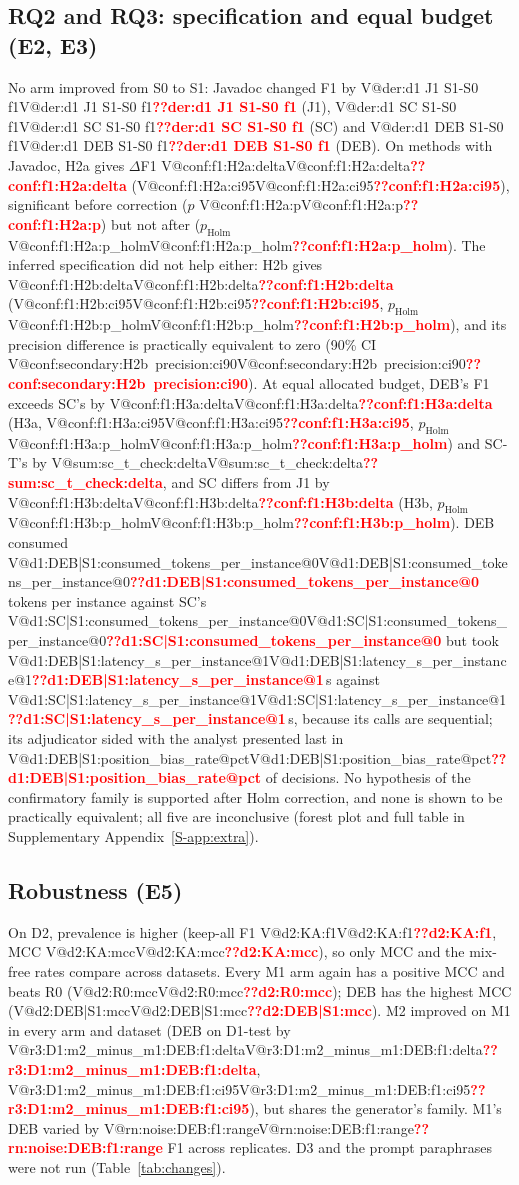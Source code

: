 \documentclass[journal]{IEEEtran}
\makeatletter
\newcommand{\V}[1]{\ifcsname V@#1\endcsname\csname V@#1\endcsname\else\textbf{\textcolor{red}{??#1}}\fi}
\newcommand{\Sref}[1]{\ref{S-#1}}
\makeatother
\begin{document}
\subsection{RQ2 and RQ3: specification and equal budget (E2, E3)}
No arm improved from S0 to S1: Javadoc changed F1 by \V{der:d1 J1 S1-S0 f1} (J1), \V{der:d1 SC S1-S0 f1} (SC) and \V{der:d1 DEB S1-S0 f1} (DEB). On methods with Javadoc, H2a gives $\Delta$F1 \V{conf:f1:H2a:delta} (\V{conf:f1:H2a:ci95}), significant before correction ($p$ \V{conf:f1:H2a:p}) but not after ($p_\mathrm{Holm}$ \V{conf:f1:H2a:p_holm}). The inferred specification did not help either: H2b gives \V{conf:f1:H2b:delta} (\V{conf:f1:H2b:ci95}, $p_\mathrm{Holm}$ \V{conf:f1:H2b:p_holm}), and its precision difference is practically equivalent to zero (90\% CI \V{conf:secondary:H2b~precision:ci90}). At equal allocated budget, DEB's F1 exceeds SC's by \V{conf:f1:H3a:delta} (H3a, \V{conf:f1:H3a:ci95}, $p_\mathrm{Holm}$ \V{conf:f1:H3a:p_holm}) and SC-T's by \V{sum:sc_t_check:delta}, and SC differs from J1 by \V{conf:f1:H3b:delta} (H3b, $p_\mathrm{Holm}$ \V{conf:f1:H3b:p_holm}). DEB consumed \V{d1:DEB|S1:consumed_tokens_per_instance@0} tokens per instance against SC's \V{d1:SC|S1:consumed_tokens_per_instance@0} but took \V{d1:DEB|S1:latency_s_per_instance@1}\,s against \V{d1:SC|S1:latency_s_per_instance@1}\,s, because its calls are sequential; its adjudicator sided with the analyst presented last in \V{d1:DEB|S1:position_bias_rate@pct} of decisions. No hypothesis of the confirmatory family is supported after Holm correction, and none is shown to be practically equivalent; all five are inconclusive (forest plot and full table in Supplementary Appendix~\Sref{app:extra}).

\subsection{Robustness (E5)}\label{sec:robust}
On D2, prevalence is higher (keep-all F1 \V{d2:KA:f1}, MCC \V{d2:KA:mcc}), so only MCC and the mix-free rates compare across datasets. Every M1 arm again has a positive MCC and beats R0 (\V{d2:R0:mcc}); DEB has the highest MCC (\V{d2:DEB|S1:mcc}). M2 improved on M1 in every arm and dataset (DEB on D1-test by \V{r3:D1:m2_minus_m1:DEB:f1:delta}, \V{r3:D1:m2_minus_m1:DEB:f1:ci95}), but shares the generator's family. M1's DEB varied by \V{rn:noise:DEB:f1:range} F1 across replicates. D3 and the prompt paraphrases were not run (Table~\ref{tab:changes}).
\end{document}
